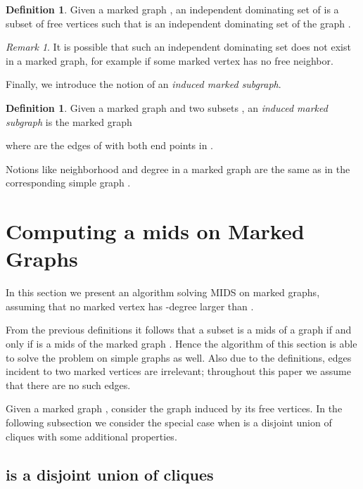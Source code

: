 \documentclass[a4paper,10pt]{article}
\theoremstyle{plain}
\theoremstyle{definition}
\newtheorem{definition}[theorem]{Definition}
\theoremstyle{remark}
\newtheorem*{remark}{Remark}
\newcommand{\ids}{independent dominating set\xspace}
\newcommand{\MIDSpb}{\textsc{MIDS}\xspace}
\newcommand{\mids}{mids\xspace}
\begin{document}
\begin{definition}
\label{defidsmarked}
Given a marked graph , an \ids 
of  is a subset of free vertices such that
 is an \ids of the graph .
\end{definition}

\begin{remark}
It is possible that such an \ids does not exist in a marked graph,
for example if some marked vertex has no free neighbor.
\end{remark}

\noindent Finally, we introduce the notion of an \emph{induced marked subgraph}.

\begin{definition}
Given a marked graph  and two subsets , an
\emph{induced marked subgraph}  is the marked graph

where  are the edges of  with
both end points in .
\end{definition}

\noindent Notions like neighborhood and degree in a marked graph  are
the same as in the corresponding simple graph .



\section{Computing a \mids on Marked Graphs}


In this section we present an algorithm
solving \MIDSpb on marked graphs, assuming that no marked vertex has -degree larger than .

{F}rom the previous definitions it follows that
a subset  is a \mids of a graph 
if and only if  is a \mids of the
marked graph . Hence the algorithm
of this section is able to solve the problem on simple graphs as well.
Also due to the definitions, edges incident to two marked vertices
are irrelevant; throughout this paper we assume that there are no such edges.


\medskip

Given a marked graph , consider the graph  induced by
its free vertices. In the following subsection we consider the special case
when  is a disjoint union of cliques with some additional properties.


\subsection{ is a disjoint union of cliques}
\label{sec:cliques}
\end{document}
